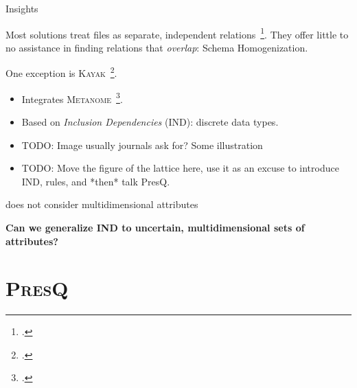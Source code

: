 \documentclass[10pt]{beamer}
\newcommand{\PresQ}[0]{\textsc{PresQ}\xspace}
\begin{document}
\begin{frame}{Insights}
    \begin{block}{}
        Most solutions treat files as separate, independent relations~\footcite{Silva2016}. They offer
        little to no assistance in finding relations that \textit{overlap}: \alert{Schema Homogenization}.
    \end{block}
    \begin{block}{}
        One exception is \textsc{Kayak}~\footcite{maccioni_crossing_2017}.
        \begin{itemize}
            \item Integrates \textsc{Metanome}~\footcite{papenbrock2015data}.
            \item Based on \emph{Inclusion Dependencies} (IND): discrete data types.
            \item TODO: Image usually journals ask for? Some illustration
            \item TODO: Move the figure of the lattice here, use it as an excuse to introduce IND, rules, and *then* talk PresQ.
        \end{itemize}
    \end{block}
    \begin{block}{}
        \cite{alawini2016} does not consider multidimensional attributes
    \end{block}
    \alert{\textbf{Can we generalize IND to uncertain, multidimensional sets of attributes?}}
\end{frame}

\section{\PresQ}

\end{document}
